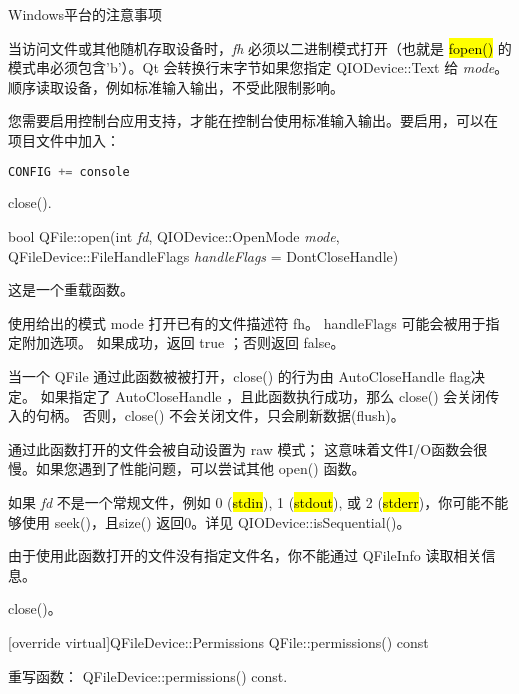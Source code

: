 Windows平台的注意事项

当访问文件或其他随机存取设备时，\emph{fh} 必须以二进制模式打开（也就是
\hl{fopen()} 的模式串必须包含'b'）。Qt 会转换行末字节如果您指定
QIODevice::Text 给 \emph{
mode}。顺序读取设备，例如标准输入输出，不受此限制影响。

您需要启用控制台应用支持，才能在控制台使用标准输入输出。要启用，可以在
项目文件中加入：

\begin{lstlisting}[language=C++]
CONFIG += console
\end{lstlisting}

\begin{seeAlso}
close().
\end{seeAlso}

bool QFile::open(int \emph{fd}, QIODevice::OpenMode \emph{mode}, QFileDevice::FileHandleFlags 
\emph{handleFlags} = DontCloseHandle)

这是一个重载函数。

使用给出的模式 mode 打开已有的文件描述符 fh。
handleFlags 可能会被用于指定附加选项。
如果成功，返回 true ；否则返回 false。

当一个 QFile 通过此函数被被打开，close() 的行为由 AutoCloseHandle flag决定。
如果指定了 AutoCloseHandle ，且此函数执行成功，那么 close() 会关闭传入的句柄。
否则，close() 不会关闭文件，只会刷新数据(flush)。

通过此函数打开的文件会被自动设置为 raw 模式；
这意味着文件I/O函数会很慢。如果您遇到了性能问题，可以尝试其他 open() 函数。

\begin{warning}

\end{warning} 

\begin{compactitem}
\item 如果 \emph{fd} 不是一个常规文件，例如 0 (\hl{stdin}), 1 (\hl{stdout}), 或 2 (\hl{stderr})，你可能不能够使用 seek()，且size() 返回0。详见 QIODevice::isSequential()。
\item 由于使用此函数打开的文件没有指定文件名，你不能通过 QFileInfo 读取相关信息。
\end{compactitem}


\begin{seeAlso}
 close()。
\end{seeAlso}

[override virtual]QFileDevice::Permissions QFile::permissions() const

重写函数： QFileDevice::permissions() const.

